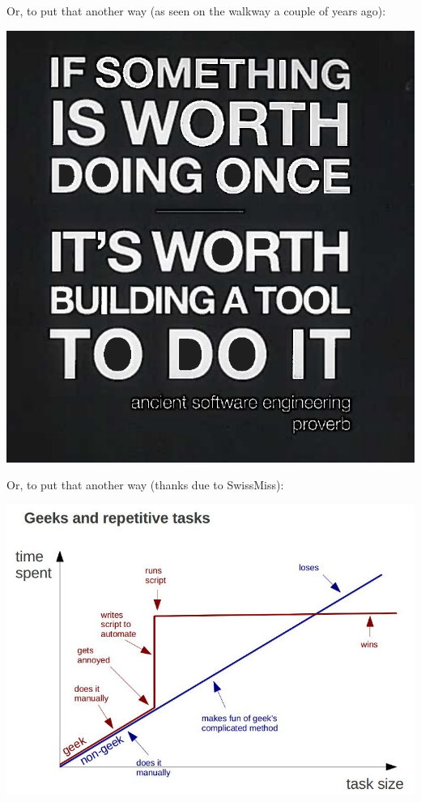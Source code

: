 \documentclass[aspectratio=169]{beamer}
\begin{document}
\begin{frame}
Or, to put that another way (as seen on the walkway a couple of years ago):

\centering
\vspace{10pt}
\includegraphics[height=0.8\textheight]{Build.png}

\end{frame}


\begin{frame}
Or, to put that another way
(thanks due to SwissMiss):

\centering
\vspace{10pt}
\includegraphics[height=0.8\textheight]{Geeks.jpg}

\end{frame}
\end{document}
